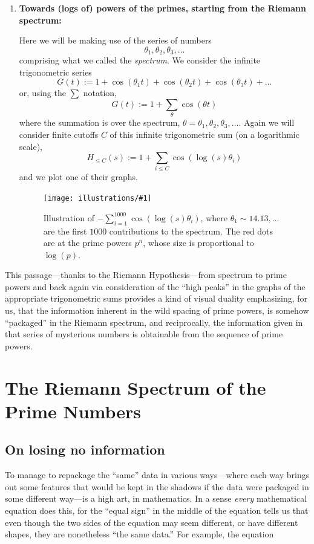\documentclass[openany]{book}
\newcommand{\ill}[3]{%
   \begin{figure}[H]%
   \vspace{-2ex}
   \centering%
   \texttt{[image: illustrations/\#1]}%
   \caption{#3}%
   \vspace{-2ex}
    \end{figure}}
\theoremstyle{plain}
\theoremstyle{definition}
\begin{document}
{\begin{enumerate}
\item{\bf Towards (logs of) powers of the primes, starting from the Riemann spectrum:}

  Here we will be making use of the series of numbers $$\theta_1,
  \theta_2, \theta_3, \dots$$ comprising what we called the {\it
    spectrum}. We consider the infinite trigonometric series
  $$
  G(t):= 1 + \cos(\theta_1t)+\cos(\theta_2t)+\cos(\theta_3t)+\dots
  $$
  or, using the $\sum$ notation,
 $$
 G(t):=  1+\sum_{\theta}\cos(\theta t)
 $$
 where the summation is over the spectrum, $\theta=\theta_1, \theta_2,
 \theta_3, \dots$. Again we will consider finite cutoffs $C$ of this
 infinite trigonometric sum (on a logarithmic scale),
 $$
 H_{\le C}(s):= 1+\sum_{i \leq C}\cos(\log(s) \theta_i)
 $$
 and we plot one of their graphs.

 \ill{phi_cos_sum_2_30_1000}{.8}{Illustration of $-\sum_{i=1}^{1000}
   \cos(\log(s)\theta_i)$, where $\theta_1 \sim 14.13, \ldots$ are the
   first $1000$ contributions to the spectrum.  The red dots
   are at the prime powers $p^n$, whose size is proportional to
   $\log(p)$.\label{fig:phihat}}

\end{enumerate}

This passage---thanks to the Riemann Hypothesis---from spectrum to
prime powers and back again via consideration of the ``high peaks'' in
the graphs of the appropriate trigonometric sums provides a kind of
visual duality emphasizing, for us, that the information inherent in
the wild spacing of prime powers, is somehow ``packaged'' in the Riemann spectrum, and reciprocally,
the information given in that series of mysterious numbers is
obtainable from the sequence of prime powers.



\part{The Riemann Spectrum of the Prime Numbers\label{part3}}


\chapter{On losing no information\label{sec:loseno}}

To manage to repackage the ``same'' data in various ways---where each
way brings out some features that would be kept in the shadows if the
data were packaged in some different way---is a high art, in
mathematics. In a sense {\it every} mathematical equation does this,
for the ``equal sign'' in the middle of the equation tells us that
even though the two sides of the equation may seem different, or have
different shapes, they are nonetheless ``the same data.''  For
example, the equation

}
\end{document}
